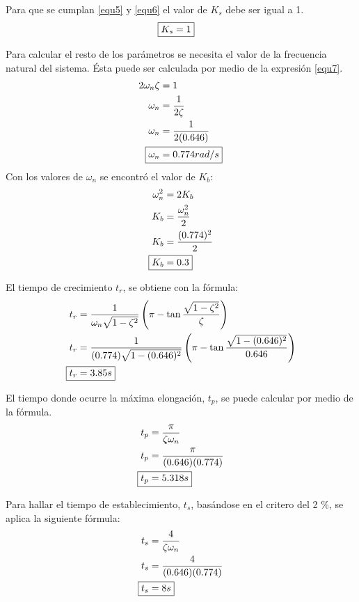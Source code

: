 \documentclass[journal]{IEEEtran}
\begin{document}
Para que se cumplan \ref{equ5} y \ref{equ6} el valor de $K_s$ 
debe ser igual a 1. 
\begin{align*}
	\Aboxed{ K_s = 1} 	
\end{align*}

Para calcular el resto de los par\'ametros se necesita el 
valor de la frecuencia natural del sistema. \'Esta puede ser
calculada por medio de la expresi\'on \ref{equ7}. 
\begin{align*}
	2 \omega_n \zeta & = 1 \\
	\omega_n & = \frac{1}{2 \zeta} \\
	\omega_n & = \frac{1}{2 (0.646)} \\
	\Aboxed{ \omega_n & = 0.774 rad/s}
\end{align*}
Con los valores de $\omega_n $ se encontr\'o el valor de 
$K_b$: 
\begin{align*}
	\omega^2_n & = 2 K_b \\ 
	K_b & = \frac{\omega^2_n}{2} \\
	K_b & = \frac{(0.774)^2}{2} \\
	\Aboxed{ K_b & = 0.3}
\end{align*}

El tiempo de crecimiento $t_r$, se obtiene con la 
f\'ormula:
\begin{align*}
	t_r & = \frac{1}{\omega_n \sqrt{1 - \zeta^2}}\left(
	\pi - \tan \frac{\sqrt{1 - \zeta^2 }}{\zeta}\right)\\
	t_r & = \frac{1}{(0.774)\sqrt{1 - (0.646)^2}}\left(
	\pi - \tan \frac{\sqrt{1 - (0.646)^2 }}{0.646}\right)\\
	\Aboxed{ t_r & = 3.85 s } 
\end{align*}

El tiempo donde ocurre la m\'axima elongaci\'on, $t_p$, 
se puede calcular por medio de la f\'ormula. 
\begin{align*}
	t_p & = \frac{\pi}{\zeta \omega_n}  \\ 
	t_p & = \frac{\pi}{(0.646)(0.774)} \\
	\Aboxed{ t_p & = 5.318 s}  
\end{align*}

Para hallar el tiempo de establecimiento, $t_s$, bas\'andose
en el critero del 2 \%, se aplica la siguiente f\'ormula: 
\begin{align*}
	t_s & = \frac{4}{\zeta \omega_n} \\ 
	t_s & = \frac{4}{(0.646)(0.774)} \\
	\Aboxed{ t_s & = 8 s} \\
\end{align*}
\end{document}
